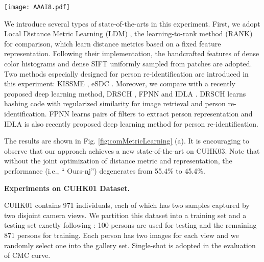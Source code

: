 \documentclass[letterpaper]{article}
\begin{document}
\begin{figure*}
  \centering
  \texttt{[image: AAAI8.pdf]}
 \vspace{-3mm}
  \caption{Quantitative results on the three datasets: (a) CUHK03, (b) CUHK01 and (c) iLIDS dataset. Our DARI framework leads superior performances over existing state-of-the-arts overall. Note that ``Ours-nj'' represents a simplified version of our model, i.e. discarding the joint optimization of distance metric and CNN-based feature. }
\label{fig:comMetricLearning}       \vspace{-3mm}
\end{figure*}

We introduce several types of state-of-the-arts in this experiment. First, we adopt Local Distance Metric Learning (LDM) \cite{guillaumin2009you}, the learning-to-rank method (RANK) \cite{mcfee2010metric} for comparison, which learn distance metrics based on a fixed feature representation. Following their implementation, the handcrafted features of dense color histograms and dense SIFT uniformly sampled from patches are adopted. Two methods especially designed for person re-identification are introduced in this experiment: KISSME \cite{kostinger2012large}, eSDC \cite{zhao2013unsupervised}. Moreover, we compare with a recently proposed deep learning method, DRSCH \cite{zhang2015bit}, FPNN \cite{li2014deepreid} and IDLA \cite{ahmed2015improved}. DRSCH \cite{zhang2015bit} learns hashing code with regularized similarity for image retrieval and person re-identification. FPNN \cite{li2014deepreid} learns pairs of filters to extract person representation and IDLA \cite{ahmed2015improved} is also recently proposed deep learning method for person re-identification.

The results are shown in Fig. \ref{fig:comMetricLearning} (a). It is encouraging to observe that our approach achieves a new state-of-the-art on CUHK03. Note that without the joint optimization of distance metric and representation, the performance (i.e., `` Ours-nj'') degenerates from 55.4\% to 45.4\%.

\textbf{Experiments on CUHK01 Dataset.}

CUHK01 contains 971 individuals, each of which has two samples captured by two disjoint camera views. We partition this dataset into a training set and a testing set exactly following \cite{li2014deepreid}\cite{ahmed2015improved}:  100 persons are used for testing and the remaining 871 persons for training.  Each person has two images for each view and we randomly select one into the gallery set. Single-shot is adopted in the evaluation of CMC curve.
\end{document}
